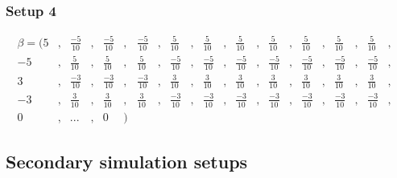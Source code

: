 \subsubsection{Setup 4}
\begin{equation} \label{eq:setup4} 
\begin{aligned}
\beta = (	5&,& \frac{-5}{10}&,&  \frac{-5}{10}&,&  \frac{-5}{10}&,&  \frac{5}{10}&,&  \frac{5}{10}&,&  \frac{5}{10}&,&  \frac{5}{10}&,&  \frac{5}{10}&,&  \frac{5}{10}&,&  \frac{5}{10}&,& \\
-5&,& \frac{5}{10}&,&  \frac{5}{10}&,&  \frac{5}{10}&,&  \frac{-5}{10}&,&  \frac{-5}{10}&,&  \frac{-5}{10}&,&  \frac{-5}{10}&,&  \frac{-5}{10}&,&  \frac{-5}{10}&,&  \frac{-5}{10}&,& \\
3&,& \frac{-3}{10}&,&  \frac{-3}{10}&,&  \frac{-3}{10}&,&  \frac{3}{10}&,&  \frac{3}{10}&,&  \frac{3}{10}&,&  \frac{3}{10}&,&  \frac{3}{10}&,&  \frac{3}{10}&,&  \frac{3}{10}&,& \\
-3&,& \frac{3}{10}&,&  \frac{3}{10}&,&  \frac{3}{10}&,&  \frac{-3}{10}&,&  \frac{-3}{10}&,&  \frac{-3}{10}&,&  \frac{-3}{10}&,&  \frac{-3}{10}&,&  \frac{-3}{10}&,&  \frac{-3}{10}&,& \\
0&,& ...&,& 0&)&
\end{aligned}
\end{equation}



\subsection{Secondary simulation setups}